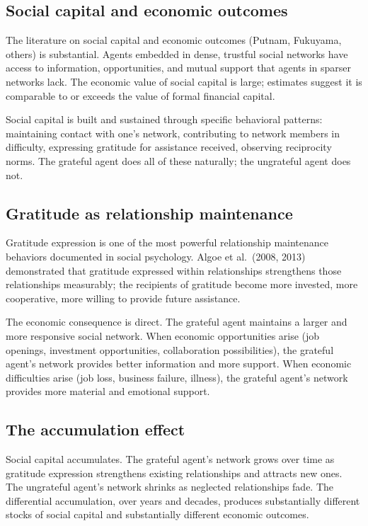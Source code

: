 \subsection{Social capital and economic outcomes}

The literature on social capital and economic outcomes (Putnam,
Fukuyama, others) is substantial. Agents embedded in dense,
trustful social networks have access to information, opportunities,
and mutual support that agents in sparser networks lack. The
economic value of social capital is large; estimates suggest it
is comparable to or exceeds the value of formal financial capital.

Social capital is built and sustained through specific behavioral
patterns: maintaining contact with one's network, contributing to
network members in difficulty, expressing gratitude for assistance
received, observing reciprocity norms. The grateful agent does all
of these naturally; the ungrateful agent does not.

\subsection{Gratitude as relationship maintenance}

Gratitude expression is one of the most powerful relationship
maintenance behaviors documented in social psychology. Algoe et
al.\ (2008, 2013) demonstrated that gratitude expressed within
relationships strengthens those relationships measurably; the
recipients of gratitude become more invested, more cooperative,
more willing to provide future assistance.

The economic consequence is direct. The grateful agent maintains a
larger and more responsive social network. When economic
opportunities arise (job openings, investment opportunities,
collaboration possibilities), the grateful agent's network
provides better information and more support. When economic
difficulties arise (job loss, business failure, illness), the
grateful agent's network provides more material and emotional
support.

\subsection{The accumulation effect}

Social capital accumulates. The grateful agent's network grows over
time as gratitude expression strengthens existing relationships
and attracts new ones. The ungrateful agent's network shrinks as
neglected relationships fade. The differential accumulation, over
years and decades, produces substantially different stocks of
social capital and substantially different economic outcomes.

